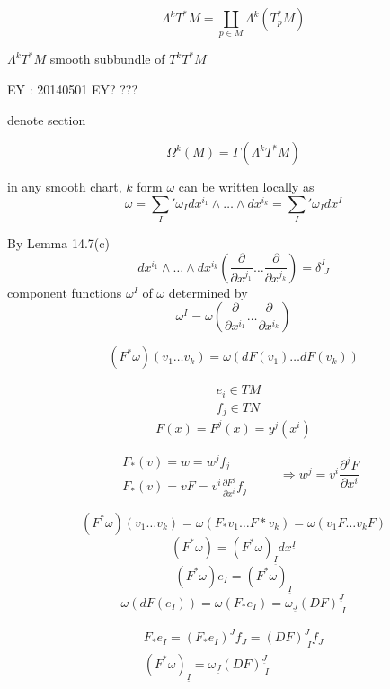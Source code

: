 \[
\Lambda^k T^*M = \coprod_{ p \in M} \Lambda^k{ ( T^*_p M )}
\]


$\Lambda^k T^*M$ smooth subbundle of $T^kT^*M$

EY : 20140501 EY? ???

\hrulefill

denote section

\[
\Omega^k{ (M) } = \Gamma{ (\Lambda^k T^* M ) }
\]



in any smooth chart, $k$ form $\omega$ can be written locally as 
\[
\omega = \sum_I' \omega_I dx^{i_1} \wedge \dots \wedge dx^{i_k} = \sum_I' \omega_I dx^I
\]

By Lemma 14.7(c)
\[
dx^{i_1} \wedge \dots \wedge dx^{i_k} \left( \frac{ \partial }{ \partial x^{j_1} } \dots \frac{ \partial }{ \partial x^{j_k} } \right) = \delta^I_{\, \, J}
\]
component functions $\omega^I$ of $\omega$ determined by 
\[
\omega^I = \omega\left( \frac{ \partial }{ \partial x^{i_1} } \dots \frac{ \partial }{ \partial x^{i_k} } \right)
\]

\[
(F^* \omega)(v_1 \dots v_k) = \omega( dF(v_1) \dots dF(v_k) )
\]

\[
\begin{aligned}
  & e_i \in TM \\ 
  & f_j \in TN
\end{aligned}
\]
\[
F(x) = F^j(x) = y^j( x^i)
\]

\[
\begin{aligned}
  & F_*(v) = w = w^j f_j \\ 
  & F_*(v) = vF = v^i \frac{ \partial F^j}{ \partial x^i } f_j
\end{aligned} \quad \quad \, \Longrightarrow w^j = v^i \frac{ \partial^j F}{ \partial x^i}
\]

\[
(F^*\omega)(v_1 \dots v_k)  = \omega(F_*v_1 \dots F*v_k) = \omega(v_1 F \dots v_k F)
\]
\[
(F^*\omega) = (F^* \omega)_{ \underline{I}} dx^{ \underline{I}}
\]
\[
(F^* \omega) e_I = (F^* \omega)_{\underline{I}}
\]
\[
\omega(dF(e_I)) = \omega(F_* e_I) = \omega_{\underline{J}}(DF)^{\underline{J}}_{ \, \, I }
\]

\[
\begin{gathered}
  F_*e_I = (F_* e_I)^J f_J = (DF)^J_{ \, \, I } f_J \\ 
 (F^* \omega)_{\underline{I}} = \omega_{\underline{J}} (DF)^{\underline{J}}_{ \, \, I } 
\end{gathered}
\]



